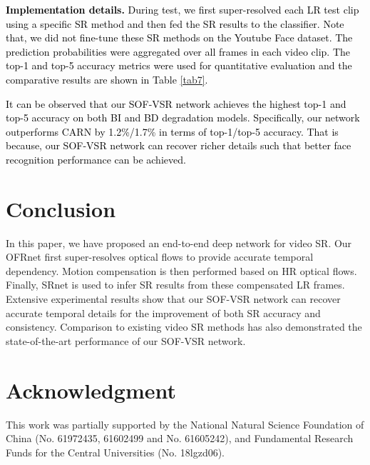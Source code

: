 \documentclass[journal]{IEEEtran}
\begin{document}
\begin{table*}[htp]
	\textcolor{black}{
	\textbf{Implementation details.} During test, we first super-resolved each LR test clip using a specific SR method and then fed the SR results to the classifier. Note that, we did not fine-tune these SR methods on the Youtube Face dataset. The prediction probabilities were aggregated over all frames in each video clip. The top-1 and top-5 accuracy metrics were used for quantitative evaluation and the comparative results are shown in Table \ref{tab7}.}
	
	\textcolor{black}{
	It can be observed that our SOF-VSR network achieves the highest top-1 and top-5 accuracy on both BI and BD degradation models. Specifically, our network outperforms CARN by 1.2\%/1.7\% in terms of top-1/top-5 accuracy. That is because, our SOF-VSR network can recover richer details such that better face recognition performance can be achieved.}
	
	
	\section{Conclusion}
	In this paper, we have proposed an end-to-end deep network for video SR. Our OFRnet first super-resolves optical flows to provide accurate temporal dependency. Motion compensation is then performed based on HR optical flows. Finally, SRnet is used to infer SR results from these compensated LR frames. Extensive experimental results show that our SOF-VSR network can recover accurate temporal details for the improvement of both SR accuracy and consistency. Comparison to existing video SR methods has also demonstrated the state-of-the-art performance of our SOF-VSR network. 
	
	
	
	
	
	
	
\section*{Acknowledgment}
	This work was partially supported by the National Natural Science Foundation of China (No. 61972435, 61602499 and No. 61605242), and Fundamental Research Funds for the Central Universities (No. 18lgzd06).
	
	
\ifCLASSOPTIONcaptionsoff
	\newpage
	\fi
	
	
	
	
	
	


	



\end{table*}
\end{document}
